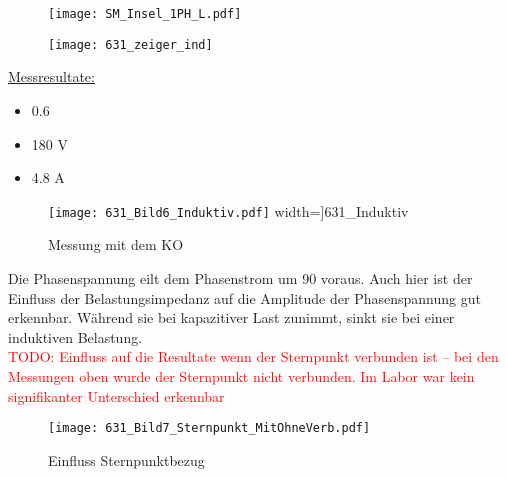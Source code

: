 \begin{flushleft}
\begin{figure}[H]
\begin{minipage}[t]{0.52\textwidth}
\centering
\texttt{[image: SM\_Insel\_1PH\_L.pdf]}
\label{fig:abb1}
\end{minipage}
\begin{minipage}[t]{0.48\textwidth}
\centering
\texttt{[image: 631\_zeiger\_ind]}
    \label{fig:abb1}
\end{minipage}
\end{figure}


\underline{Messresultate:}\\
\vspace{0.3cm}


\begin{itemize}
\item {}     0.6\degree
\item {}            180 V
\item {}            4.8 A
\end{itemize}

\vspace{0.5cm}

\begin{figure}[H]
\centering
        \texttt{[image: 631\_Bild6\_Induktiv.pdf]}
				width=\textwidth]{631_Induktiv}
    \caption{Messung mit dem KO}
    \label{fig:abb1}
\end{figure}

Die Phasenspannung eilt dem Phasenstrom um 90 \degree voraus. Auch hier ist der Einfluss der Belastungsimpedanz auf die Amplitude der Phasenspannung gut erkennbar. Während sie bei kapazitiver Last zunimmt, sinkt sie bei einer induktiven Belastung. \\

\textcolor{red}{TODO: Einfluss auf die Resultate wenn der Sternpunkt verbunden ist -- bei den Messungen oben wurde der Sternpunkt nicht verbunden. Im Labor war kein signifikanter Unterschied erkennbar}

\begin{figure}[H]
    \centering
        \texttt{[image: 631\_Bild7\_Sternpunkt\_MitOhneVerb.pdf]}
    \caption{Einfluss Sternpunktbezug}
    \label{fig:abb1}
\end{figure}






\end{flushleft}
